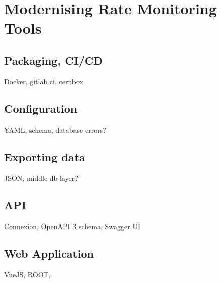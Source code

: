 \chapter{Modernising Rate Monitoring Tools}

\section{Packaging, CI/CD}

Docker, gitlab ci, cernbox

\section{Configuration}

YAML, schema, database errors?

\section{Exporting data}

JSON, middle db layer?

\section{API}

Connexion, OpenAPI 3 schema, Swagger UI

\section{Web Application}

VueJS, ROOT,